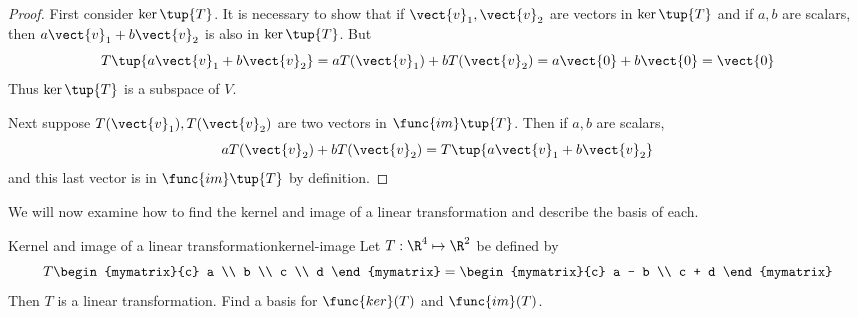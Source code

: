 \begin{proof}
First consider $\ker \tup{T}$. It is necessary to
show that if $\vect{v}_{1},\vect{v}_{2}$ are vectors in $\ker \tup{T} $
and if $a,b$ are scalars, then $a\vect{v}_{1}+b\vect{v}_{2}$ is also in $\ker
\tup{T}$. But 
\begin{equation*}
T\tup{a\vect{v}_{1}+b\vect{v}_{2}} =aT(\vect{v}_{1})+bT(\vect{v}_{2})=a\vect{0}+b\vect{0}=\vect{0}
\end{equation*}
Thus $\ker \tup{T} $ is a subspace of $V$.

Next suppose $T(\vect{v}_{1}),T(\vect{v}_{2})$ are two vectors in $\func{im}\tup{
T}$. Then if $a,b$ are scalars, 
\begin{equation*}
aT(\vect{v}_{2})+bT(\vect{v}_{2})=T\tup{a\vect{v}_{1}+b\vect{v}_{2}}
\end{equation*}
and this last vector is in $\func{im}\tup{T} $ by definition. 
\end{proof}

We will now examine how to find the kernel and image of a linear transformation and describe the basis of each. 

\begin{example}{Kernel and image of a linear transformation}{kernel-image}
Let $T: \R^4 \mapsto \R^2$ be defined by
\[
T \begin{mymatrix}{c}
a \\
b \\
c \\
d
\end{mymatrix} = 
\begin{mymatrix}{c}
a - b \\ 
c + d
\end{mymatrix}
\]
Then $T$ is a linear transformation. Find a basis for $\func{ker}(T)$ and $\func{im}(T)$. 
\end{example}

